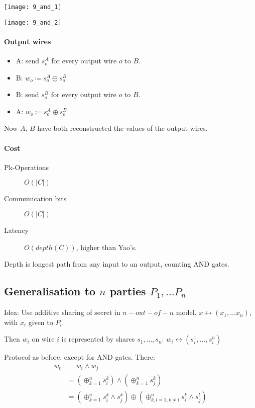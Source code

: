 \texttt{[image: 9\_and\_1]}

\texttt{[image: 9\_and\_2]}

\paragraph{Output wires}

\begin{itemize}
		\item A: send ${s^A_o}$ for every output wire $o$ to $B$.
		\item B: $w_o \coloneqq s^A_o \oplus s^B_o$
		\item B: send ${s^B_o}$ for every output wire $o$ to $B$.
		\item A: $w_o \coloneqq s^A_o \oplus s^B_o$
\end{itemize}

Now $A$, $B$ have both reconstructed the values of the output wires.

\paragraph{Cost}

\begin{description}
		\item[Pk-Operations] $O(|C|)$
		\item[Communication bits] $O(|C|)$
		\item[Latency] $O(depth(C))$, higher than Yao's.
\end{description}

Depth is longest path from any input to an output, counting AND gates.

\subsection{Generalisation to $n$ parties $P_1, \ldots P_n$}

Idea: Use additive sharing of secret in $n-out-of-n$ model, $x \leftrightarrow
(x_1, \ldots x_n)$, with $x_i$ given to $P_i$.

Then $w_i$ on wire $i$ is represented by shares $s_1, \ldots, s_n$: $w_i
\leftrightarrow (s^1_i, \ldots, s^n_i)$

Protocol as before, except for AND gates. There:
\begin{align*}
		w_t & = w_i \land w_j \\
			& = (\oplus_{k=1}^n s^k_i) \land (\oplus_{k=1}^n s^k_j) \\
			& = (\oplus_{k=1}^n s^k_i \land s^k_j) \oplus (\oplus_{k, l = 1, k \neq l}^n s^k_i \land s^l_j) \\
\end{align*}

